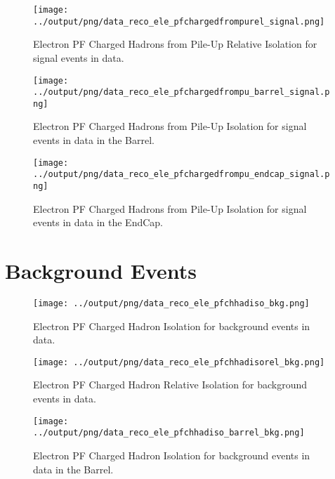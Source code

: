 \documentclass[11pt]{book}
\begin{document}
\begin{figure}[htb]
\centering
\texttt{[image: ../output/png/data\_reco\_ele\_pfchargedfrompurel\_signal.png]}
\caption{Electron PF Charged Hadrons from Pile-Up Relative Isolation for signal events in data.}
\label{fig:data_ele_pfchargedfrompurel_signal}
\end{figure}

\begin{figure}[htb]
\centering
\texttt{[image: ../output/png/data\_reco\_ele\_pfchargedfrompu\_barrel\_signal.png]}
\caption{Electron PF Charged Hadrons from Pile-Up Isolation for signal events in data in the Barrel.}
\label{fig:data_ele_pfchargedfrompu_barrel_signal}
\end{figure}

\begin{figure}[htb]
\centering
\texttt{[image: ../output/png/data\_reco\_ele\_pfchargedfrompu\_endcap\_signal.png]}
\caption{Electron PF Charged Hadrons from Pile-Up Isolation for signal events in data in the EndCap.}
\label{fig:data_ele_pfchargedfrompu_endcap_signal}
\end{figure}


\clearpage

\section{Background Events}

\begin{figure}[htb]
\centering
\texttt{[image: ../output/png/data\_reco\_ele\_pfchhadiso\_bkg.png]}
\caption{Electron PF Charged Hadron Isolation for background events in data.}
\label{fig:data_ele_pfchhadiso_bkg}
\end{figure}

\begin{figure}[htb]
\centering
\texttt{[image: ../output/png/data\_reco\_ele\_pfchhadisorel\_bkg.png]}
\caption{Electron PF Charged Hadron Relative Isolation for background events in data.}
\label{fig:data_ele_pfchhadisorel_bkg}
\end{figure}

\begin{figure}[htb]
\centering
\texttt{[image: ../output/png/data\_reco\_ele\_pfchhadiso\_barrel\_bkg.png]}
\caption{Electron PF Charged Hadron Isolation for background events in data in the Barrel.}
\label{fig:data_ele_pfchhadiso_barrel_bkg}
\end{figure}
\end{document}
